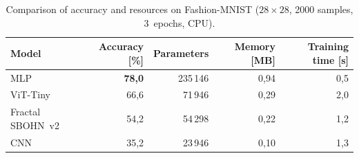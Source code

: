 \begin{table}[htbp]
\centering
\caption{Comparison of accuracy and resources on Fashion-MNIST ($28\times28$, 2000 samples, 3~epochs, CPU).}
\label{tab:sota_acc}
\begin{tabular}{|l|r|r|r|r|}
\hline
\textbf{Model} & \textbf{Accuracy [\%]} & \textbf{Parameters} & \textbf{Memory [MB]} & \textbf{Training time [s]} \\
\hline
MLP & \textbf{78,0} & 235\,146 & 0,94 & 0,5 \\
\hline
ViT-Tiny & 66,6 & 71\,946 & 0,29 & 2,0 \\
\hline
Fractal SBOHN~v2 & 54,2 & 54\,298 & 0,22 & 1,2 \\
\hline
CNN & 35,2 & 23\,946 & 0,10 & 1,3 \\
\hline
\end{tabular}
\end{table}
